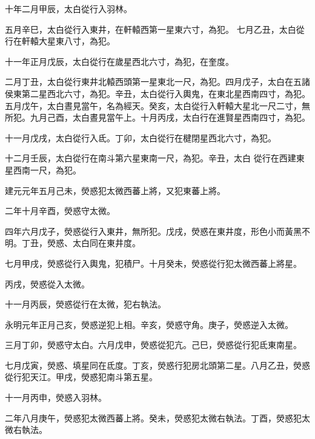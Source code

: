 \begin{pinyinscope}
 十年二月甲辰，太白從行入羽林。



 五月辛巳，太白從行入東井，在軒轅西第一星東六寸，為犯。
 七月乙丑，太白從行在軒轅大星東八寸，為犯。



 十一年正月戊辰，太白從行在歲星西北六寸，為犯，在奎度。



 二月丁丑，太白從行東井北轅西頭第一星東北一尺，為犯。四月戊子，太白在五諸侯東第二星西北六寸，為犯。辛丑，太白從行入輿鬼，在東北星西南四寸，為犯。五月戊午，太白晝見當午，名為經天。癸亥，太白從行入軒轅大星北一尺二寸，無所犯。九月己酉，太白晝見當午上。十月丙戌，太白行在進賢星西南四寸，為犯。



 十一月戊戌，太白從行入氐。丁卯，太白從行在楗閉星西北六寸，為犯。



 十二月壬辰，太白從行在南斗第六星東南一尺，為犯。辛丑，太白
 從行在西建東星西南一尺，為犯。



 建元元年五月己未，熒惑犯太微西蕃上將，又犯東蕃上將。



 二年十月辛酉，熒惑守太微。



 四年六月戊子，熒惑從行入東井，無所犯。戊戌，熒惑在東井度，形色小而黃黑不明。丁丑，熒惑、太白同在東井度。



 七月甲戌，熒惑從行入輿鬼，犯積尸。十月癸未，熒惑從行犯太微西蕃上將星。



 丙戌，熒惑從入太微。



 十一月丙辰，熒惑從行在太微，犯右執法。



 永明元年正月己亥，熒惑逆犯上相。辛亥，熒惑守角。庚子，熒惑逆入太微。



 三月丁卯，熒惑守太白。六月戊申，熒惑從犯亢。己巳，熒惑從行犯氐東南星。



 七月戊寅，熒惑、填星同在氐度。丁亥，熒惑行犯房北頭第二星。八月乙丑，熒惑從行犯天江。甲戌，熒惑犯南斗第五星。



 十一月丙申，熒惑入羽林。



 二年八月庚午，熒惑犯太微西蕃上將。癸未，熒惑犯太微右執法。丁酉，熒惑犯太微右執法。




\end{pinyinscope}
